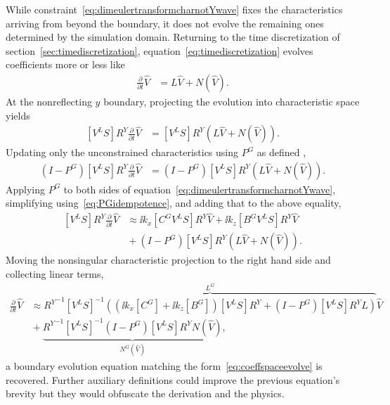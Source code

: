 While constraint~\eqref{eq:dimeulertransformcharnotYwave} fixes the
characteristics arriving from beyond the boundary, it does not evolve the
remaining ones determined by the simulation domain.  Returning to the time
discretization of section~\ref{sec:timediscretization},
equation~\eqref{eq:timediscretization} evolves coefficients more or less like
\begin{align}
\label{eq:coeffspaceevolve}
  \frac{\partial}{\partial{}t} \hat{V} &= L \hat{V} + N(\hat{V})
  .
\end{align}
At the nonreflecting $y$ boundary, projecting the evolution into characteristic
space yields
\begin{align}
  \left[V^L S\right] R^Y
  \frac{\partial}{\partial{}t} \hat{V} &=
  \left[V^L S\right] R^Y
  \left(
    L \hat{V}
    +
    N(\hat{V})
  \right)
  .
\end{align}
Updating only the unconstrained characteristics using $P^G$ as defined
,
\begin{align}
  \left(I - P^G\right)
  \left[V^L S\right] R^Y
  \frac{\partial}{\partial{}t} \hat{V}
&=
  \left(I - P^G\right)
  \left[V^L S\right] R^Y
  \left(
    L \hat{V}
    +
    N(\hat{V})
  \right)
  .
\end{align}
Applying $P^G$ to both sides of
equation~\eqref{eq:dimeulertransformcharnotYwave}, simplifying
using~\eqref{eq:PGidempotence}, and adding that to the above equality,
\begin{align}
  \left[V^L S\right]
  R^Y
  \frac{\partial}{\partial{}t}
  \hat{V}
&\approx
  \ii k_x
  \left[C^G V^L S\right]
  R^Y
  \hat{V}
  +
  \ii k_z
  \left[B^G V^L S\right]
  R^Y
  \hat{V}
\\
&{}+
  \left(I - P^G\right)
  \left[V^L S\right] R^Y
  \left(
    L \hat{V}
    +
    N(\hat{V})
  \right)
.
\end{align}
Moving the nonsingular characteristic projection to the right hand side and
collecting linear terms,
\begin{align}
\label{eq:dimeulertransformevolve}
  \frac{\partial}{\partial{}t}
  \hat{V}
&\approx
\overbrace{
  {R^Y}^{-1}
  \left[V^L S\right]^{-1}
  \left(
    \left( \ii k_x \left[C^G\right] + \ii k_z \left[B^G\right] \right)
    \left[V^L S\right] R^Y
    +
    \left(I-P^G\right)
    \left[V^L S\right] R^Y
    L
  \right)
}^{L^G}
  \hat{V}
\\
&{}+
\underbrace{
  {R^Y}^{-1}
  \left[V^L S\right]^{-1}
  \left(I - P^G\right)
  \left[V^L S\right] R^Y
  N(\hat{V})
}_{N^G\left(\hat{V}\right)}
,
\end{align}
a boundary evolution equation matching the form~\eqref{eq:coeffspaceevolve} is
recovered.  Further auxiliary definitions could improve the previous equation's
brevity but they would obfuscate the derivation and the physics.

